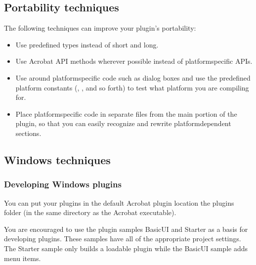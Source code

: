 \documentclass[letterpaper,12pt,english,openany,oneside]{sphinxmanual}
\begin{document}
\subsection{Portability techniques}
\label{\detokenize{Plugins_CreatingSimplePlug:portability-techniques}}
The following techniques can improve your plugin’s portability:
\begin{itemize}
\item {} 
Use predefined types instead of short and long.

\item {} 
Use Acrobat API methods wherever possible instead of platform\sphinxhyphen{}specific APIs.

\item {} 
Use  around platform\sphinxhyphen{}specific code such as dialog boxes and use the predefined platform constants (, , and so forth) to test what platform you are compiling for.

\item {} 
Place platform\sphinxhyphen{}specific code in separate files from the main portion of the plugin, so that you can easily recognize and rewrite platform\sphinxhyphen{}dependent sections.

\end{itemize}


\subsection{Windows techniques}
\label{\detokenize{Plugins_CreatingSimplePlug:windows-techniques}}

\subsubsection{Developing Windows plugins}
\label{\detokenize{Plugins_CreatingSimplePlug:developing-windows-plugins}}
You can put your plugins in the default Acrobat plugin location the plugins folder (in the same directory as the Acrobat executable).

You are encouraged to use the plugin samples BasicUI and Starter as a basis for developing plugins. These samples have all of the appropriate project settings. The Starter sample only builds a loadable plugin while the BasicUI sample adds menu items.
\end{document}
